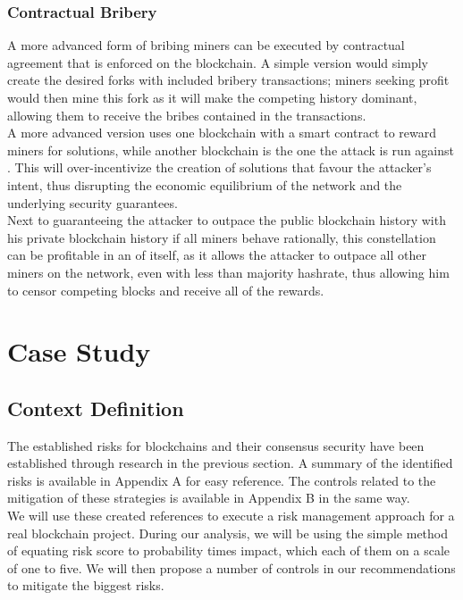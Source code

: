 \documentclass[12pt,a4paper]{article}
\begin{document}
\subsubsection{Contractual Bribery}

A more advanced form of bribing miners can be executed by contractual agreement that is enforced on the blockchain. A simple version would simply create the desired forks with included bribery \glspl{transaction}; miners seeking profit would then mine this fork as it will make the competing history dominant, allowing them to receive the bribes contained in the \glspl{transaction}.\\

A more advanced version uses one \gls{blockchain} with a smart contract to reward miners for solutions, while another \gls{blockchain} is the one the attack is run against \cite{puzzles}. This will over-incentivize the creation of solutions that favour the attacker's intent, thus disrupting the economic equilibrium of the network and the underlying security guarantees.\\

Next to guaranteeing the attacker to outpace the public blockchain history with his private blockchain history if all miners behave rationally, this constellation can be profitable in an of itself, as it allows the attacker to outpace all other miners on the network, even with less than majority \gls{hashrate}, thus allowing him to censor competing blocks and receive all of the rewards.\\

\section{Case Study}

\subsection{Context Definition}

The established risks for \gls{blockchain}s and their \gls{consensus} security have been established through research in the previous section. A summary of the identified risks is available in Appendix A for easy reference. The controls related to the mitigation of these strategies is available in Appendix B in the same way.\\

We will use these created references to execute a risk management approach for a real blockchain project. During our analysis, we will be using the simple method of equating risk score to probability times impact, which each of them on a scale of one to five. We will then propose a number of controls in our recommendations to mitigate the biggest risks.\\
\end{document}
